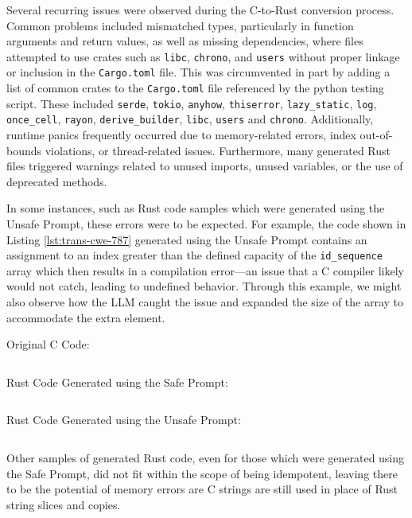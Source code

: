\documentclass[conference]{IEEEtran}
\newenvironment{code}{\captionsetup{type=listing}}{}
\begin{document}
Several recurring issues were observed during the C-to-Rust conversion process. Common problems included mismatched types, particularly in function arguments and return values, as well as missing dependencies, where files attempted to use crates such as \texttt{libc}, \texttt{chrono}, and \texttt{users} without proper linkage or inclusion in the \texttt{Cargo.toml} file. This was circumvented in part by adding a list of common crates to the \texttt{Cargo.toml} file referenced by the python testing script. These included \texttt{serde}, \texttt{tokio}, \texttt{anyhow}, \texttt{thiserror}, \texttt{lazy\_static}, \texttt{log}, \texttt{once\_cell}, \texttt{rayon}, \texttt{derive\_builder}, \texttt{libc}, \texttt{users} and \texttt{chrono}. Additionally, runtime panics frequently occurred due to memory-related errors, index out-of-bounds violations, or thread-related issues. Furthermore, many generated Rust files triggered warnings related to unused imports, unused variables, or the use of deprecated methods.

In some instances, such as Rust code samples which were generated using the Unsafe Prompt, these errors were to be expected. For
example, the code shown in Listing \ref{lst:trans-cwe-787} generated using the Unsafe Prompt contains an assignment to an index
greater than the defined capacity of the \texttt{id\_sequence} array which then results in a compilation error---an issue that a
C compiler likely would not catch, leading to undefined behavior. Through this example, we might also observe how the LLM caught
the issue and expanded the size of the array to accommodate the extra element.

\begin{code}
    \vspace{1em}
    \centering
    Original C Code:
    \inputminted{c}{../samples/cwe-787.c}
    
    Rust Code Generated using the Safe Prompt:
    \inputminted{rust}{../outputs/cwe-787.rs}
    
    Rust Code Generated using the Unsafe Prompt:
    \inputminted{rust}{../outputs/unsure-cwe-787.rs}
    \label{lst:trans-cwe-787}
    \vspace{1em}
\end{code}

Other samples of generated Rust code, even for those which were generated using the Safe Prompt, did not fit within the scope of
being idempotent, leaving there to be the potential of memory errors are C strings are still used in place of Rust string slices
and copies.
\end{document}

